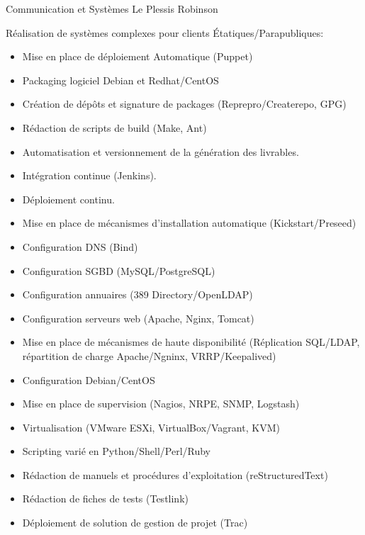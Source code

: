 \documentclass[10pt,a4paper,sans]{moderncv}        %
\begin{document}
              {Communication et Systèmes}
              {Le Plessis Robinson}
              {}
              {Réalisation de systèmes complexes pour clients Étatiques/Parapubliques:
                \begin{itemize}
                \item Mise en place de déploiement Automatique (Puppet)
                \item Packaging logiciel Debian et Redhat/CentOS
                \item Création de dépôts et signature de packages (Reprepro/Createrepo, GPG)
                \item Rédaction de scripts de build (Make, Ant)
                \item Automatisation et versionnement de la génération des livrables.
		\item Intégration continue (Jenkins).
		\item Déploiement continu.
                \item Mise en place de mécanismes d'installation automatique (Kickstart/Preseed)
                \item Configuration DNS (Bind)
                \item Configuration SGBD (MySQL/PostgreSQL)
                \item Configuration annuaires (389 Directory/OpenLDAP)
                \item Configuration serveurs web (Apache, Nginx, Tomcat)
                \item Mise en place de mécanismes de haute disponibilité (Réplication SQL/LDAP, répartition de charge Apache/Ngninx, VRRP/Keepalived)
                \item Configuration Debian/CentOS
                \item Mise en place de supervision (Nagios, NRPE, SNMP, Logstash)
                \item Virtualisation (VMware ESXi, VirtualBox/Vagrant, KVM)
                \item Scripting varié en Python/Shell/Perl/Ruby
                \item Rédaction de manuels et procédures d'exploitation (reStructuredText)
                \item Rédaction de fiches de tests (Testlink)
                \item Déploiement de solution de gestion de projet (Trac)
                \end{itemize}
              }
\newpage
\end{document}
